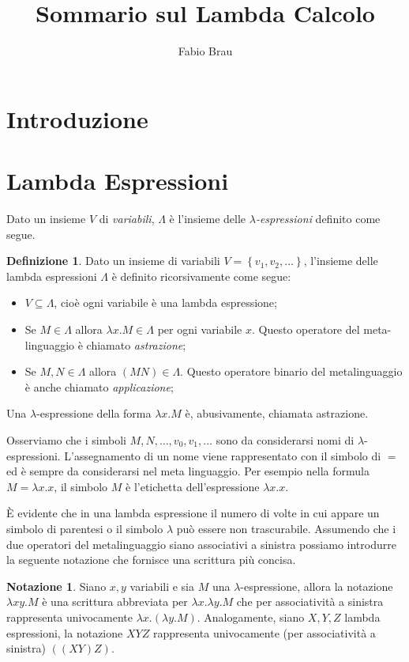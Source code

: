 \documentclass[a4paper,11pt]{article}
\title{Sommario sul Lambda Calcolo}
\author{Fabio Brau}
\theoremstyle{definition}
\newtheorem{defn}{Definizione}
\newtheorem{notazione}{Notazione}
\begin{document}
\maketitle
\tableofcontents
\section{Introduzione}
\section{Lambda Espressioni}
Dato un insieme $V$ di \textit{variabili}, 
$\Lambda$ è l'insieme delle \textit{$\lambda$-espressioni} definito come
segue.
\begin{defn}
  Dato un insieme di variabili $V=\left\{ v_1,v_2,\dots \right\}$, 
  l'insieme delle lambda espressioni $\Lambda$ è definito ricorsivamente come
  segue:
  \begin{itemize}
    \item $V\subseteq\Lambda$, cioè ogni variabile è una lambda espressione;
    \item Se $M\in\Lambda$ allora $\lambda x.M\in\Lambda$ per ogni variabile
      $x$. Questo operatore del meta-linguaggio è chiamato
      \textit{astrazione};
    \item Se $M,N\in\Lambda$ allora $(MN)\in\Lambda$. Questo operatore
      binario del metalinguaggio è anche chiamato \textit{applicazione};
  \end{itemize}

  Una $\lambda$-espressione della forma $\lambda x.M$ è, abusivamente,
  chiamata astrazione.
\end{defn}

Osserviamo che i simboli $M, N,\dots,v_0,v_1,\dots$ sono da considerarsi nomi
di $\lambda$-espressioni. L'assegnamento di un nome viene rappresentato con il simbolo di
$=$ ed è sempre da considerarsi nel meta linguaggio. Per esempio nella
formula $M=\lambda x.x$, il simbolo $M$ è l'etichetta dell'espressione
$\lambda x.x$. 

È evidente che in una lambda espressione il numero di volte in cui appare un
simbolo di parentesi o il simbolo $\lambda$ può essere non trascurabile.
Assumendo che i due operatori del metalinguaggio siano associativi a sinistra
possiamo introdurre la seguente notazione che fornisce una scrittura più concisa.
\begin{notazione}
  \label{not:sinistra}
  Siano $x,y$ variabili e sia $M$ una $\lambda$-espressione, allora la notazione
  $\lambda xy.M$ è una scrittura abbreviata per $\lambda x.\lambda y.M$ che
  per associatività a sinistra rappresenta univocamente $\lambda x.(\lambda y.M)$.
  Analogamente, siano $X,Y,Z$ lambda espressioni, la notazione $XYZ$
  rappresenta univocamente (per associatività a sinistra) $((XY)Z)$.
\end{notazione}
\end{document}
